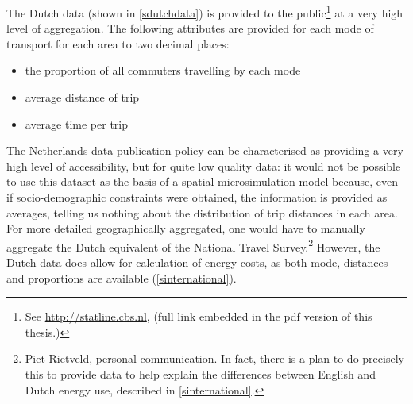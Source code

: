 The Dutch data (shown in \cref{sdutchdata}) is provided to the
public\footnote{See {\color{blue}\href{http://statline.cbs.nl/StatWeb/publication/?DM=SLNL&PA=81129ned&D1=0-1,3&D2=0&D3=a&D4=1&D5=0-12&D6=a&HDR=T&STB=G1,G2,G3,G4,G5&VW=T}{http://statline.cbs.nl}},
(full link embedded in the pdf version of this thesis.)} at a
very high level of aggregation. The following attributes are provided for
each mode of transport for each area to two decimal places:
\begin{itemize}
 \item the proportion of all commuters travelling by each mode
 \item average distance of trip
 \item average time per trip
\end{itemize}
The Netherlands data publication policy can be characterised as providing
a very high level of accessibility, but for quite low quality data: it would
not be possible to use this dataset as the basis of a spatial microsimulation
model because, even if socio-demographic constraints were obtained, the
information is provided as averages, telling us nothing about the distribution
of trip distances in each area.
For more detailed geographically aggregated, one would have to
manually aggregate the Dutch equivalent of the National Travel
Survey.\footnote{Piet Rietveld, personal communication.
In fact, there is a plan to do precisely this to provide data to help
explain the differences between English and Dutch energy use, described in
\cref{sinternational}.}
However, the Dutch data does allow for calculation of energy costs, as both
mode, distances and proportions are available (\cref{sinternational}).

